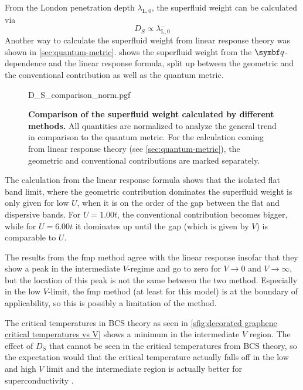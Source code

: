 \documentclass[../notes.tex]{subfiles}
\begin{document}
From the London penetration depth \(\lambda_{\mathrm{L}, 0}\), the superfluid weight can be calculated via
\begin{equation}
	D_S \propto \lambda_{\mathrm{L}, 0}^{-}
\end{equation}
Another way to calculate the superfluid weight from linear response theory was shown in \cref{sec:quantum-metric}.
 shows the superfluid weight from the \(\vb{q}\)-dependence and the linear response formula, split up between the geometric and the conventional contribution as well as the quantum metric.
\begin{figure}[!tb]
	\centering
	{D_S_comparison_norm.pgf}
	\caption[Comparison of the superfluid weight calculated by different methods.]{
		\textbf{Comparison of the superfluid weight calculated by different methods.} All quantities are normalized to analyze the general trend in comparison to the quantum metric.
		For the calculation coming from linear response theory (see \cref{sec:quantum-metric}), the geometric and conventional contributions are marked separately.
	}
	\label{fig:decorated graphene comparison of DS normalized}
\end{figure}
The calculation from the linear response formula shows that the isolated flat band limit, where the geometric contribution dominates the superfluid weight is only given for low \(U\), when it is on the order of the gap between the flat and dispersive bands.
For \(U = 1.00t\), the conventional contribution becomes bigger, while for \(U = 6.00t\) it dominates up until the gap (which is given by \(V\)) is comparable to \(U\).

The results from the \gls{fmp} method agree with the linear response insofar that they show a peak in the intermediate \(V\)-regime and go to zero for \(V \to 0\) and \(V \to \infty\), but the location of this peak is not the same between the two method.
Especially in the low \(V\)-limit, the \gls{fmp} method (at least for this model) is at the boundary of applicability, so this is possibly a limitation of the method.

The critical temperatures in BCS theory as seen in \cref{sfig:decorated graphene critical temperatures vs V} shows a minimum in the intermediate \(V\) region.
The effect of \(D_S\) that cannot be seen in the critical temperatures from BCS theory, so the expectation would that the critical temperature actually falls off in the low and high \(V\) limit and the intermediate region is actually better for superconductivity .
\end{document}
